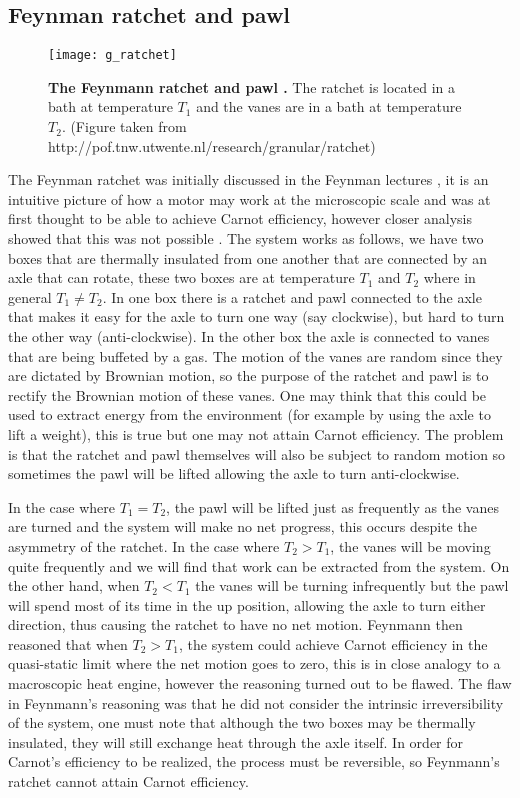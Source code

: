 \subsection{Feynman ratchet and pawl}
\begin{figure}
	\center
	\texttt{[image: g\_ratchet]}
	\caption{\textbf{The Feynmann ratchet and pawl \cite{Feynman1963}.} The ratchet is located in a bath at temperature $T_1$ and the vanes are in a bath at temperature $T_2$.  (Figure taken from http://pof.tnw.utwente.nl/research/granular/ratchet) \label{fig:feynmannRatchet}}
\end{figure}
The Feynman ratchet was initially discussed in the Feynman lectures \cite{Feynman1963}, it is an intuitive picture of how a motor may work at the microscopic scale and was at first thought to be able to achieve Carnot efficiency, however closer analysis showed that this was not possible \cite{ParrondoEspanol1996}. The system works as follows, we have two boxes that are thermally insulated from one another that are connected by an axle that can rotate, these two boxes are at temperature $T_1$ and $T_2$ where in general $T_1 \neq T_2$. In one box there is a ratchet and pawl connected to the axle that makes it easy for the axle to turn one way (say clockwise), but hard to turn the other way (anti-clockwise). In the other box the axle is connected to vanes that are being buffeted by a gas. The motion of the vanes are random since they are dictated by Brownian motion, so the purpose of the ratchet and pawl is to rectify the Brownian motion of these vanes. One may think that this could be used to extract energy from the environment (for example by using the axle to lift a weight), this is true but one may not attain Carnot efficiency. The problem is that the ratchet and pawl themselves will also be subject to random motion so sometimes the pawl will be lifted allowing the axle to turn anti-clockwise.

In the case where $T_1 = T_2$, the pawl will be lifted just as frequently as the vanes are turned and the system will make no net progress, this occurs despite the asymmetry of the ratchet. In the case where $T_2 > T_1$, the vanes will be moving quite frequently and we will find that work can be extracted from the system. On the other hand, when $T_2 < T_1$ the vanes will be turning infrequently but the pawl will spend most of its time in the up position, allowing the axle to turn either direction, thus causing the ratchet to have no net motion. Feynmann then reasoned that when $T_2 > T_1$, the system could achieve Carnot efficiency in the quasi-static limit where the net motion goes to zero, this is in close analogy to a macroscopic heat engine, however the reasoning turned out to be flawed. The flaw in Feynmann's reasoning  was that he did not consider the intrinsic irreversibility of the system, one must note that although the two boxes may be thermally insulated, they will still exchange heat through the axle itself. In order for Carnot's efficiency to be realized, the process must be reversible, so Feynmann's ratchet cannot attain Carnot efficiency.  


